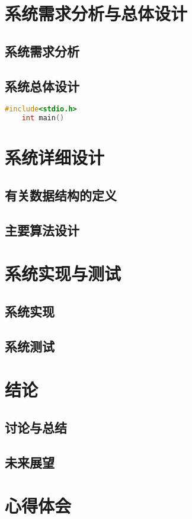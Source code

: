 \documentclass{ctexrep}
\begin{document}
\chapter{系统需求分析与总体设计}
\section{系统需求分析}
\section{系统总体设计}


\begin{lstlisting}[language=C]
    #include<stdio.h>
    int main()
\end{lstlisting}


\chapter{系统详细设计}
\section{有关数据结构的定义}
\section{主要算法设计}


\chapter{系统实现与测试}
\section{系统实现}
\section{系统测试}


\chapter{结论}
\section{讨论与总结}
\section{未来展望}

\chapter{心得体会}





  
\end{document}

